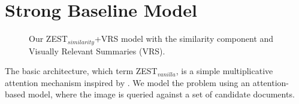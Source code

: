 \documentclass[11pt,a4paper]{article}
\newcommand\yuval[1]{\textcolor{darkpink}{\textbf{YUVAL:} #1 }}
\begin{document}

\section{Strong Baseline Model}
\label{task}



\begin{figure}[th]
\centering
{}
 \caption{Our ZEST$_{similarity}$+VRS model with the similarity component and Visually Relevant Summaries (VRS).}
\label{fig:model}
\end{figure}

The basic architecture, which term ZEST$_{vanilla}$, is a simple multiplicative attention mechanism \cite{luong2015effective} inspired by \citet{romera2015embarrassingly}. We model the problem using an attention-based model, where the image is queried
against a set of candidate documents.




\end{document}
